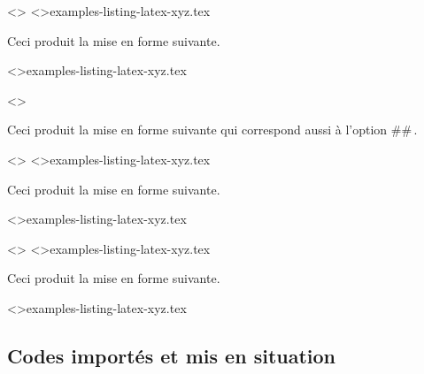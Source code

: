 \begin{tdocexa}
    \leavevmode

    \begin{tdoclatex}<>
\tdoclatexinput<>{examples-listing-latex-xyz.tex}
    \end{tdoclatex}

    Ceci produit la mise en forme suivante.

    \tdoclatexinput<>{examples-listing-latex-xyz.tex}
\end{tdocexa}


\begin{tdocexa}[À la suite]
    \leavevmode

    \begin{tdoclatex}<>
    \end{tdoclatex}

    Ceci produit la mise en forme suivante qui correspond aussi à l'option \tdoclatexin##\,.

\end{tdocexa}


\begin{tdocexa}
    \leavevmode

    \begin{tdoclatex}<>
\tdoclatexinput<>{examples-listing-latex-xyz.tex}
    \end{tdoclatex}

    Ceci produit la mise en forme suivante.

    \tdoclatexinput<>{examples-listing-latex-xyz.tex}
\end{tdocexa}


\begin{tdocexa}[Personnaliser]
    \leavevmode

    \begin{tdoclatex}<>
\tdoclatexinput[style=igor, showspaces]<>{examples-listing-latex-xyz.tex}
    \end{tdoclatex}

    Ceci produit la mise en forme suivante.

	\tdoclatexinput[style = igor, showspaces]<>{examples-listing-latex-xyz.tex}
\end{tdocexa}



\subsection{Codes importés et mis en situation}
\label{tutodoc-listing-latexshow}

